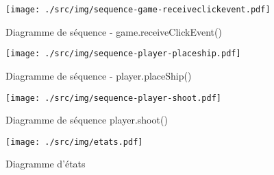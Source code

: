 \documentclass[11pt]{article} %
\begin{document}
\begin{figure}[h!]
	\centering
	\texttt{[image: ./src/img/sequence-game-receiveclickevent.pdf]}
	\caption{Diagramme de séquence - game.receiveClickEvent()}
\end{figure}

\begin{figure}[h!]
	\centering
	\texttt{[image: ./src/img/sequence-player-placeship.pdf]}
	\caption{Diagramme de séquence - player.placeShip()}
\end{figure}

\begin{figure}[h!]
	\centering
	\texttt{[image: ./src/img/sequence-player-shoot.pdf]}
	\caption{Diagramme de séquence player.shoot()}
\end{figure}

\begin{figure}[h!]
	\centering
	\texttt{[image: ./src/img/etats.pdf]}
	\caption{Diagramme d'états}
\end{figure}
\end{document}
